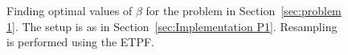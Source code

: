 \documentclass[final]{siamltex}
\begin{document}
\begin{figure}[htb]
\centering
{}
\caption{Finding optimal values of $\beta$ for the problem in Section~\ref{sec:problem 1}. The setup is as in Section~\ref{sec:Implementation P1}. Resampling is performed using the ETPF.}
\label{fig:P1 opt beta}
\end{figure}
\end{document}
